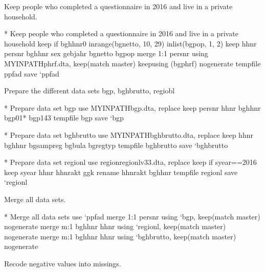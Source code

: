 \documentclass[letterpaper,10pt,openany,onesideH,english]{sphinxmanual}
\begin{document}
Keep people who completed a questionnaire in 2016 and live in a private household.

%
\begin{sphinxVerbatim}[commandchars=\\\{\},numbers=left,firstnumber=1,stepnumber=1]
* Keep people who completed a questionnaire in 2016 and live in a private household
keep if bghhnr\PYGZgt{}0 \PYGZam{} inrange(bgnetto, 10, 29) \PYGZam{} inlist(bgpop, 1, 2)
keep hhnr persnr bghhnr sex gebjahr bgnetto bgpop
merge 1:1  persnr using \PYGZdl{}\PYGZob{}MY\PYGZus{}IN\PYGZus{}PATH\PYGZcb{}\PYGZbs{}phrf.dta, keep(match master) keepusing (bgphrf) nogenerate
tempfile ppfad
save {}`ppfad\PYGZsq{}
\end{sphinxVerbatim}

Prepare the different data sets bgp, bghbrutto, regiobl

%
\begin{sphinxVerbatim}[commandchars=\\\{\},numbers=left,firstnumber=1,stepnumber=1]
* Prepare data set bgp
use \PYGZdl{}\PYGZob{}MY\PYGZus{}IN\PYGZus{}PATH\PYGZcb{}\PYGZbs{}bgp.dta, replace
keep persnr hhnr bghhnr bgp01* bgp143
tempfile bgp
save {}`bgp\PYGZsq{}

* Prepare data set bghbrutto
use \PYGZdl{}\PYGZob{}MY\PYGZus{}IN\PYGZus{}PATH\PYGZcb{}\PYGZbs{}bghbrutto.dta, replace
keep hhnr bghhnr bgsampreg bgbula bgregtyp
tempfile bghbrutto
save {}`bghbrutto\PYGZsq{}

* Prepare data set regionl
use \PYGZdl{}\PYGZob{}region\PYGZcb{}\PYGZbs{}regionl\PYGZus{}v33.dta, replace
keep if syear==2016
keep syear hhnr hhnrakt ggk
rename hhnrakt bghhnr
tempfile regionl
save {}`regionl\PYGZsq{}
\end{sphinxVerbatim}

Merge all data sets.

%
\begin{sphinxVerbatim}[commandchars=\\\{\},numbers=left,firstnumber=1,stepnumber=1]
* Merge all data sets
use {}`ppfad\PYGZsq{}
merge 1:1 persnr using {}`bgp\PYGZsq{}, keep(match master) nogenerate
merge m:1 bghhnr hhnr using {}`regionl\PYGZsq{}, keep(match master) nogenerate
merge m:1 bghhnr hhnr using {}`bghbrutto\PYGZsq{}, keep(match master) nogenerate
\end{sphinxVerbatim}

Recode negative values into missings.

%
\begin{sphinxVerbatim}[commandchars=\\\{\},numbers=left,firstnumber=1,stepnumber=1]
     
    
\end{sphinxVerbatim}
\end{document}
